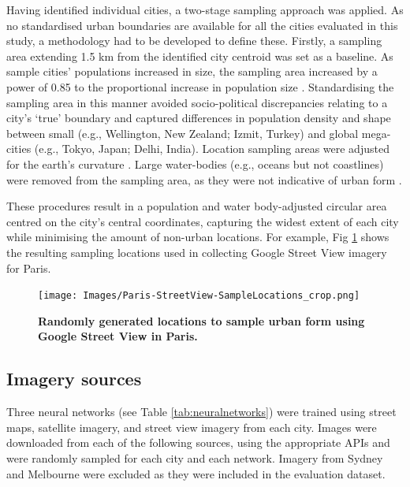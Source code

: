 \documentclass[Crown,sageh,times]{sagej}
\begin{document}
Having identified individual cities, a two-stage sampling approach was applied. As no standardised urban boundaries are available for all the cities evaluated in this study, a methodology had to be developed to define these. Firstly, a sampling area extending 1.5 km from the identified city centroid \cite{UN2014} was set as a baseline. As sample cities' populations increased in size, the sampling area increased by a power of 0.85 to the proportional increase in population size \cite{Barthelemy2016}. Standardising the sampling area in this manner avoided socio-political discrepancies relating to a city's `true' boundary and captured differences in population density and shape between small (e.g., Wellington, New Zealand; Izmit, Turkey) and global mega-cities (e.g., Tokyo, Japan;  Delhi, India). Location sampling areas were adjusted for the earth's curvature \cite{Sinnott1984}. Large water-bodies (e.g., oceans but not coastlines) were removed from the sampling area, as they were not indicative of urban form . 

These procedures result in a population and water body-adjusted circular area centred on the city's central coordinates, capturing the widest extent of each city while minimising the amount of non-urban locations. For example, Fig \ref{fig:parissample} shows the resulting sampling locations used in collecting Google Street View imagery for Paris. 

\begin{figure}[!htbp] 
\centering    
\texttt{[image: Images/Paris-StreetView-SampleLocations\_crop.png]} 
\caption{\bf Randomly generated locations to sample urban form using Google Street View in Paris.} 
\label{fig:parissample}  
\end{figure}

\label{methodsimagery}
\subsection{Imagery sources}

Three neural networks (see Table \ref{tab:neuralnetworks}) were trained using street maps, satellite imagery, and street view imagery from each city. Images were downloaded from each of the following sources, using the appropriate APIs and were randomly sampled for each city and each network. Imagery from Sydney and Melbourne were excluded as they were included in the evaluation dataset. 
\end{document}
